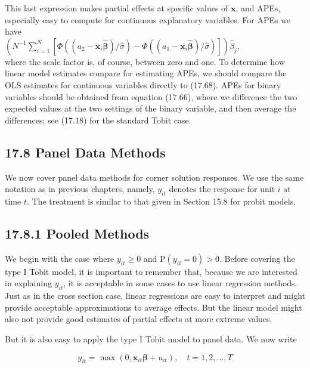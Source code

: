 \documentclass[10pt]{article}
\begin{document}
This last expression makes partial effects at specific values of $\mathbf{x}$, and APEs, especially easy to compute for continuous explanatory variables. For APEs we have\\
$\left(N^{-1} \sum_{i=1}^{N}\left[\Phi\left(\left(a_{2}-\mathbf{x}_{i} \hat{\boldsymbol{\beta}}\right) / \hat{\sigma}\right)-\Phi\left(\left(a_{1}-\mathbf{x}_{i} \hat{\boldsymbol{\beta}}\right) / \hat{\sigma}\right)\right]\right) \hat{\beta}_{j}$,\\
where the scale factor is, of course, between zero and one. To determine how linear model estimates compare for estimating APEs, we should compare the OLS estimates for continuous variables directly to (17.68). APEs for binary variables should be obtained from equation (17.66), where we difference the two expected values at the two settings of the binary variable, and then average the differences; see (17.18) for the standard Tobit case.

\subsection*{17.8 Panel Data Methods}
We now cover panel data methods for corner solution responses. We use the same notation as in previous chapters, namely, $y_{i t}$ denotes the response for unit $i$ at time $t$. The treatment is similar to that given in Section 15.8 for probit models.

\subsection*{17.8.1 Pooled Methods}
We begin with the case where $y_{i t} \geq 0$ and $\mathrm{P}\left(y_{i t}=0\right)>0$. Before covering the type I Tobit model, it is important to remember that, because we are interested in explaining $y_{i t}$, it is acceptable in some cases to use linear regression methods. Just as in the cross section case, linear regressions are easy to interpret and might provide acceptable approximations to average effects. But the linear model might also not provide good estimates of partial effects at more extreme values.

But it is also easy to apply the type I Tobit model to panel data. We now write


\begin{equation*}
y_{i t}=\max \left(0, \mathbf{x}_{i t} \boldsymbol{\beta}+u_{i t}\right), \quad t=1,2, \ldots, T \tag{17.69}
\end{equation*}
\end{document}
